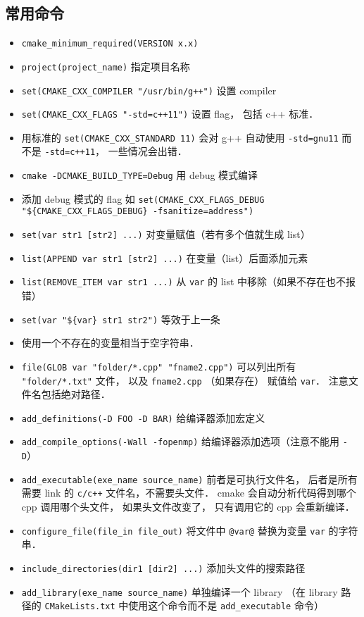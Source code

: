 \subsection{常用命令}
\begin{itemize}
\item \verb`cmake_minimum_required(VERSION x.x)`
\item \verb`project(project_name)` 指定项目名称
\item \verb|set(CMAKE_CXX_COMPILER "/usr/bin/g++")| 设置 compiler
\item \verb|set(CMAKE_CXX_FLAGS "-std=c++11")| 设置 flag， 包括 c++ 标准．
\item 用标准的 \verb|set(CMAKE_CXX_STANDARD 11)| 会对 g++ 自动使用 \verb|-std=gnu11| 而不是 \verb|-std=c++11|， 一些情况会出错．
\item \verb|cmake -DCMAKE_BUILD_TYPE=Debug| 用 debug 模式编译
\item 添加 debug 模式的 flag 如 \verb|set(CMAKE_CXX_FLAGS_DEBUG "${CMAKE_CXX_FLAGS_DEBUG} -fsanitize=address")|
\item \verb`set(var str1 [str2] ...)` 对变量赋值（若有多个值就生成 list）
\item \verb`list(APPEND var str1 [str2] ...)` 在变量（list）后面添加元素
\item \verb|list(REMOVE_ITEM var str1 ...)| 从 \verb|var| 的 list 中移除（如果不存在也不报错）
\item \verb|set(var "${var} str1 str2")| 等效于上一条
\item 使用一个不存在的变量相当于空字符串．
\item \verb`file(GLOB var "folder/*.cpp" "fname2.cpp")` 可以列出所有 \verb|"folder/*.txt"| 文件， 以及 \verb|fname2.cpp| （如果存在） 赋值给 \verb|var|． 注意文件名包括绝对路径．
\item \verb|add_definitions(-D FOO -D BAR)| 给编译器添加宏定义
\item \verb|add_compile_options(-Wall -fopenmp)| 给编译器添加选项（注意不能用 \verb|-D|）
\item \verb`add_executable(exe_name source_name)` 前者是可执行文件名， 后者是所有需要 link 的 \verb|c/c++| 文件名，不需要头文件． cmake 会自动分析代码得到哪个 cpp 调用哪个头文件， 如果头文件改变了， 只有调用它的 cpp 会重新编译．
\item \verb`configure_file(file_in file_out)` 将文件中 \verb`@var@` 替换为变量 \verb`var` 的字符串．
\item \verb`include_directories(dir1 [dir2] ...)` 添加头文件的搜索路径
\item \verb`add_library(exe_name source_name)` 单独编译一个 library （在 library 路径的 \verb|CMakeLists.txt| 中使用这个命令而不是 \verb`add_executable` 命令）

\end{itemize}
